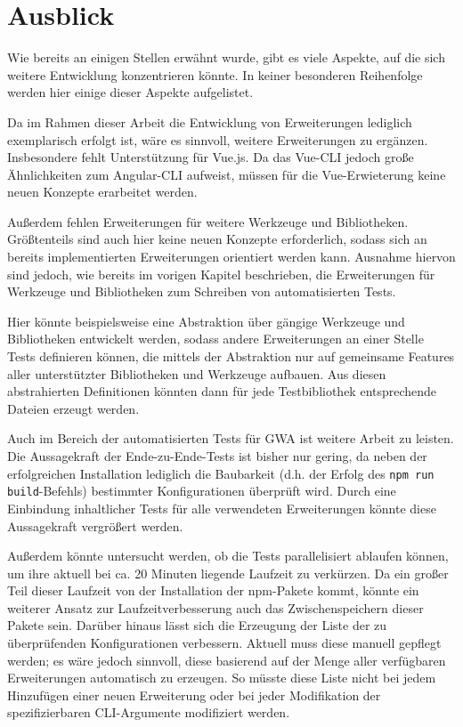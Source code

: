 \section{Ausblick}
\label{further_research}

Wie bereits an einigen Stellen erwähnt wurde, gibt es viele Aspekte, auf die sich weitere Entwicklung konzentrieren könnte. In keiner besonderen Reihenfolge werden hier einige dieser Aspekte aufgelistet.

Da im Rahmen dieser Arbeit die Entwicklung von Erweiterungen lediglich exemplarisch erfolgt ist, wäre es sinnvoll, weitere Erweiterungen zu ergänzen. Insbesondere fehlt Unterstützung für Vue.js. Da das Vue-\gls{CLI} jedoch große Ähnlichkeiten zum Angular-\gls{CLI} aufweist, müssen für die Vue-Erwieterung keine neuen Konzepte erarbeitet werden.

Außerdem fehlen Erweiterungen für weitere Werkzeuge und Bibliotheken. Größtenteils sind auch hier keine neuen Konzepte erforderlich, sodass sich an bereits implementierten Erweiterungen orientiert werden kann. Ausnahme hiervon sind jedoch, wie bereits im vorigen Kapitel beschrieben, die Erweiterungen für Werkzeuge und Bibliotheken zum Schreiben von automatisierten Tests.

Hier könnte beispielsweise eine Abstraktion über gängige Werkzeuge und Bibliotheken entwickelt werden, sodass andere Erweiterungen an einer Stelle Tests definieren können, die mittels der Abstraktion nur auf gemeinsame Features aller unterstützter Bibliotheken und Werkzeuge aufbauen. Aus diesen abstrahierten Definitionen könnten dann für jede Testbibliothek entsprechende Dateien erzeugt werden.

Auch im Bereich der automatisierten Tests für \gls{GWA} ist weitere Arbeit zu leisten. Die Aussagekraft der Ende-zu-Ende-Tests ist bisher nur gering, da neben der erfolgreichen Installation lediglich die Baubarkeit (d.h. der Erfolg des \verb/npm run build/-Befehls) bestimmter Konfigurationen überprüft wird. Durch eine Einbindung inhaltlicher Tests für alle verwendeten Erweiterungen könnte diese Aussagekraft vergrößert werden.

Außerdem könnte untersucht werden, ob die Tests parallelisiert ablaufen können, um ihre aktuell bei ca. 20 Minuten liegende Laufzeit zu verkürzen. Da ein großer Teil dieser Laufzeit von der Installation der \gls{npm}-Pakete kommt, könnte ein weiterer Ansatz zur Laufzeitverbesserung auch das Zwischenspeichern dieser Pakete sein. Darüber hinaus lässt sich die Erzeugung der Liste der zu überprüfenden Konfigurationen verbessern. Aktuell muss diese manuell gepflegt werden; es wäre jedoch sinnvoll, diese basierend auf der Menge aller verfügbaren Erweiterungen automatisch zu erzeugen. So müsste diese Liste nicht bei jedem Hinzufügen einer neuen Erweiterung oder bei jeder Modifikation der spezifizierbaren \gls{CLI}-Argumente modifiziert werden.

